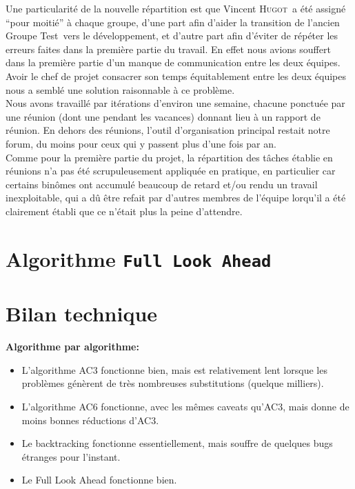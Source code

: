 \documentclass[a4paper,12pt]{article}
\def\familyname{\textsc}
\def\firstname#1{#1}
\def\groupmember#1#2{\firstname{#1} \familyname{#2}}
\def\mvin{\groupmember{Vincent}{Hugot}}
\def\grpt{Groupe Test}
\newcommand\seclvlA{
\newcommand\SA\section
\newcommand\SB\subsection
\newcommand\SC\subsubsection}
\begin{document}
\noi Une particularité de la nouvelle répartition est que \mvin\ a
été assigné ``pour moitié'' à chaque groupe, d'une part
afin d'aider la transition de l'ancien \grpt\ vers le développement,
et d'autre part afin d'éviter de répéter les erreurs faites dans la première
partie du travail. En effet nous avions souffert dans la première partie
d'un manque de communication entre les deux équipes.
Avoir le chef de projet consacrer son temps équitablement
entre les deux équipes nous a semblé une solution raisonnable
à ce problème.\mk\\
%
Nous avons travaillé par itérations d'environ une semaine,
chacune ponctuée par une réunion (dont une pendant les vacances)
donnant lieu à un rapport de réunion.
En dehors des réunions, l'outil d'organisation
principal restait notre forum, du moins pour ceux
qui y passent plus d'une fois par an.\mk\\
%
Comme pour la première partie du projet, la répartition
des tâches établie en réunions n'a pas été scrupuleusement
appliquée en pratique, 
en particulier car certains binômes ont
accumulé beaucoup de retard et/ou rendu
un travail inexploitable, qui a dû être refait par 
d'autres membres de l'équipe lorqu'il a été clairement
établi que ce n'était plus la peine d'attendre.


\section{Algorithme \texttt{Full Look Ahead}}

\seclvlA






\section{Bilan technique}

\textbf{Algorithme par algorithme:}
\begin{itemize}
\item L'algorithme AC3 fonctionne bien, mais est relativement lent lorsque les problèmes 
génèrent de très nombreuses substitutions (quelque milliers).

\item L'algorithme AC6 fonctionne, avec les mêmes caveats qu'AC3, mais donne de moins bonnes
réductions d'AC3.

\item Le backtracking fonctionne essentiellement, mais souffre de quelques bugs étranges pour l'instant. 

\item Le Full Look Ahead fonctionne bien.
  
\end{itemize}
\end{document}

